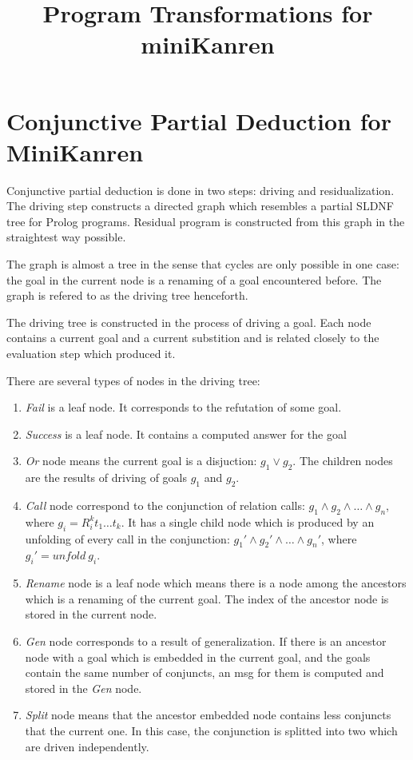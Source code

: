 \documentclass{llncs}
\begin{document}
\mainmatter

\title{Program Transformations for miniKanren}

\maketitle

\section{Conjunctive Partial Deduction for MiniKanren}

Conjunctive partial deduction is done in two steps: driving and residualization. 
The driving step constructs a directed graph which resembles a partial SLDNF tree for Prolog programs. Residual program is constructed from this graph in the straightest way possible.

The graph is almost a tree in the sense that cycles are only possible in one case: the goal in the current node is a renaming of a goal encountered before. The graph is refered to as the driving tree henceforth.

The driving tree is constructed in the process of driving a goal. Each node contains a current goal and a current substition and is related closely to the evaluation step which produced it. 

There are several types of nodes in the driving tree: 
\begin{enumerate}
  \item \emph{Fail} is a leaf node. It corresponds to the refutation of some goal.
  \item \emph{Success} is a leaf node. It contains a computed answer for the goal
  \item \emph{Or} node means the current goal is a disjuction: $g_1 \vee   g_2$. The children nodes are the results of driving of goals $g_1$ and $g_2$. 
  \item \emph{Call} node correspond to the conjunction of relation calls: $g_1 \wedge g_2 \wedge \dots \wedge g_n$, where $g_i = R^k_i t_1 \dots t_k$. It has a single child node which is produced by an unfolding of every call in the conjunction: $g_1' \wedge g_2' \wedge \dots \wedge g_n'$, where $g_i' = unfold \ g_i$.
  \item \emph{Rename} node is a leaf node which means there is a node among the ancestors which is a renaming of the current goal. The index of the ancestor node is stored in the current node. 
  \item \emph{Gen} node corresponds to a result of generalization. If there is an ancestor node with a goal which is embedded in the current goal, and the goals contain the same number of conjuncts, an msg for them is computed and stored in the \emph{Gen} node. 
  \item \emph{Split} node means that the ancestor embedded node contains less conjuncts that the current one. In this case, the conjunction is splitted into two which are driven independently. 
\end{enumerate}
\end{document}
